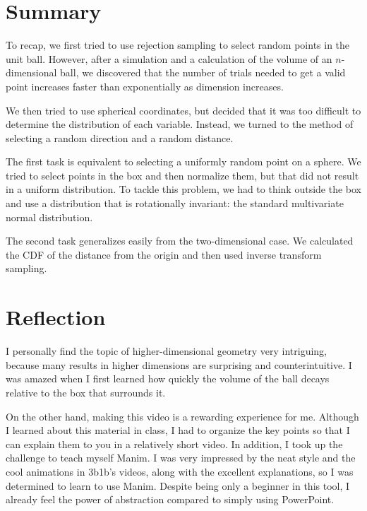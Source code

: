 \documentclass{article}
\begin{document}

\section{Summary}

To recap, we first tried to use rejection sampling to select random points in the unit ball. However, after a simulation and a calculation of the volume of an $n$-dimensional ball, we discovered that the number of trials needed to get a valid point increases faster than exponentially as dimension increases.

We then tried to use spherical coordinates, but decided that it was too difficult to determine the distribution of each variable. Instead, we turned to the method of selecting a random direction and a random distance.

The first task is equivalent to selecting a uniformly random point on a sphere. We tried to select points in the box and then normalize them, but that did not result in a uniform distribution. To tackle this problem, we had to think outside the box and use a distribution that is rotationally invariant: the standard multivariate normal distribution.

The second task generalizes easily from the two-dimensional case. We calculated the CDF of the distance from the origin and then used inverse transform sampling.

\section{Reflection}

I personally find the topic of higher-dimensional geometry very intriguing, because many results in higher dimensions are surprising and counterintuitive. I was amazed when I first learned how quickly the volume of the ball decays relative to the box that surrounds it.


On the other hand, making this video is a rewarding experience for me. Although I learned about this material in class, I had to organize the key points so that I can explain them to you in a relatively short video. In addition, I took up the challenge to teach myself Manim. I was very impressed by the neat style and the cool animations in 3b1b's videos, along with the excellent explanations, so I was determined to learn to use Manim. Despite being only a beginner in this tool, I already feel the power of abstraction compared to simply using PowerPoint.
\end{document}
